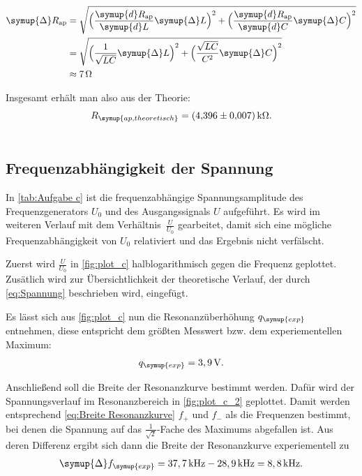 \begin{align*}
  \label{eqn:Fehler Rap}
  \symup{\Delta} R_{\text{ap}} &= \sqrt{\Bigl(\frac{\symup{d}R_{\text{ap}}}{\symup{d}L}\symup{\Delta} L \Bigr)^2+\Bigl(\frac{\symup{d}R_{\text{ap}}}{\symup{d}C}\symup{\Delta} C\Bigr)^2} \\
  &= \sqrt{\Bigl(\frac{1}{\sqrt{LC}}\symup{\Delta} L\Bigr)^2+\Bigl(\frac{\sqrt{LC}}{C^2}\symup{\Delta} C\Bigr)^2} \\
  &\approx 7\,\unit{\ohm}
\end{align*}

Insgesamt erhält man also aus der Theorie:
\begin{gather*}
  R_{\symup{ap, theoretisch}} = \qty{4,396+-0.007}{\kilo\ohm}. \\ \notag
\end{gather*}

\subsection{Frequenzabhängigkeit der Spannung}
\label{sec:Frequenzabhängigkeit der Spannung}

In \autoref{tab:Aufgabe c} ist die frequenzabhängige Spannungsamplitude des Frequenzgenerators $U_0$ und des Ausgangssignals $U$
aufgeführt. Es wird im weiteren Verlauf mit dem Verhältnis~$\frac{U}{U_{0}}$ gearbeitet, damit sich eine mögliche
Frequenzabhängigkeit von $U_0$ relativiert und das Ergebnis nicht verfälscht. 

Zuerst wird $\frac{U}{U_{0}}$ in \autoref{fig:plot_c} halblogarithmisch gegen die Frequenz geplottet.
Zusätlich wird zur Übersichtlichkeit der theoretische Verlauf, der durch \eqref{eq:Spannung} beschrieben wird, eingefügt.

Es lässt sich aus \autoref{fig:plot_c} nun die Resonanzüberhöhung $q_{\symup{exp}}$ entnehmen, diese entspricht dem größten Messwert bzw.
dem experiementellen Maximum:
\begin{gather*}
  q_{\symup{exp}} = 3,9\,\unit{\volt}. \notag
\end{gather*}

Anschließend soll die Breite der Resonanzkurve bestimmt werden.
Dafür wird der Spannungsverlauf im Resonanzbereich in \autoref{fig:plot_c_2} geplottet.
Damit werden entsprechend \eqref{eq:Breite Resonanzkurve} $f_+$ und $f_-$ als die Frequenzen bestimmt, bei denen
die Spannung auf das  $\frac{1}{\sqrt{2}}$-Fache des Maximums abgefallen ist.
Aus deren Differenz ergibt sich dann die Breite der Resonanzkurve experiementell zu
\begin{gather*}
  \symup{\Delta}f_{\symup{exp}} = 37,7\,\unit{\kilo\hertz} - 28,9\,\unit{\kilo\hertz} = 8,8\,\unit{\kilo\hertz}. \notag
\end{gather*}

